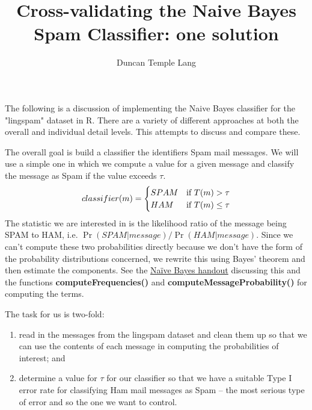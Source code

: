 \documentclass{article}
\title{Cross-validating the Naive Bayes Spam Classifier: one solution}
\author{Duncan Temple Lang}
\def\SFunction#1{\textbf{#1()}}
\def\HREF#1#2{\href{#1}{#2}}
\begin{document}
\maketitle

The following is a discussion of implementing the Naive Bayes
classifier for the "lingspam" dataset in R.  There are a variety of
different approaches at both the overall and individual detail levels.
This attempts to discuss and compare these.


The overall goal is build a classifier the identifiers Spam mail
messages.  We will use a simple one in which we compute a value for a
given message and classify the message as Spam if the value exceeds
$\tau$.
$$
  classifier(m) = 
  \begin{cases}
    SPAM & \hbox{if } T(m) > \tau \\
    HAM & \hbox{if } T(m) \le \tau
  \end{cases}
  $$ The statistic we are interested in is the likelihood ratio of the
  message being SPAM to HAM, i.e. $\Pr(SPAM \vert
  message)/\Pr(HAM\vert message)$.  Since we can't compute these two
  probabilities directly because we don't have the form of the
  probability distributions concerned, we rewrite this using Bayes'
  theorem and then estimate the components.  See the
  \HREF{../naiveBayes.pdf}{Na\"ive Bayes handout} discussing this and
  the functions \SFunction{computeFrequencies} and
  \SFunction{computeMessageProbability} for computing the terms.

The task for us is
two-fold:
\begin{enumerate}
\item read in the messages from the lingspam
dataset and clean them up so that we can use
the contents of each message in computing the
probabilities of interest; and
\item determine a value for $\tau$
  for our classifier so that we have a
  suitable Type I error rate for
  classifying Ham mail messages as Spam --
  the most serious type of error and
  so the one we want to control.
\end{enumerate}
\end{document}

